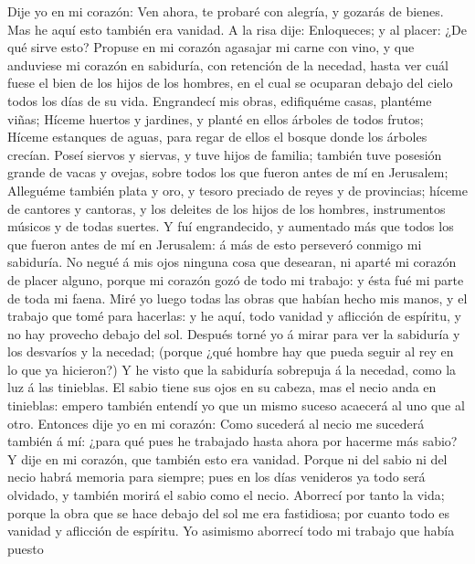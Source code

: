  Dije yo en mi corazón: Ven ahora, te probaré con alegría,
y gozarás de bienes. Mas he aquí esto también era vanidad.
 A la risa dije: Enloqueces; y al placer: ¿De qué sirve
esto?  Propuse en mi corazón agasajar mi carne con vino, y
que anduviese mi corazón en sabiduría, con retención de la necedad,
hasta ver cuál fuese el bien de los hijos de los hombres, en el cual se
ocuparan debajo del cielo todos los días de su vida. 
Engrandecí mis obras, edifiquéme casas, plantéme viñas; 
Híceme huertos y jardines, y planté en ellos árboles de todos frutos;
 Híceme estanques de aguas, para regar de ellos el bosque
donde los árboles crecían.  Poseí siervos y siervas, y
tuve hijos de familia; también tuve posesión grande de vacas y ovejas,
sobre todos los que fueron antes de mí en Jerusalem; 
Alleguéme también plata y oro, y tesoro preciado de reyes y de
provincias; híceme de cantores y cantoras, y los deleites de los hijos
de los hombres, instrumentos músicos y de todas suertes. 
Y fuí engrandecido, y aumentado más que todos los que fueron antes de mí
en Jerusalem: á más de esto perseveró conmigo mi sabiduría.
 No negué á mis ojos ninguna cosa que desearan, ni aparté
mi corazón de placer alguno, porque mi corazón gozó de todo mi trabajo:
y ésta fué mi parte de toda mi faena.  Miré yo luego
todas las obras que habían hecho mis manos, y el trabajo que tomé para
hacerlas: y he aquí, todo vanidad y aflicción de espíritu, y no hay
provecho debajo del sol.  Después torné yo á mirar para
ver la sabiduría y los desvaríos y la necedad; (porque ¿qué hombre hay
que pueda seguir al rey en lo que ya hicieron?)  Y he
visto que la sabiduría sobrepuja á la necedad, como la luz á las
tinieblas.  El sabio tiene sus ojos en su cabeza, mas el
necio anda en tinieblas: empero también entendí yo que un mismo suceso
acaecerá al uno que al otro.  Entonces dije yo en mi
corazón: Como sucederá al necio me sucederá también á mí: ¿para qué pues
he trabajado hasta ahora por hacerme más sabio? Y dije en mi corazón,
que también esto era vanidad.  Porque ni del sabio ni del
necio habrá memoria para siempre; pues en los días venideros ya todo
será olvidado, y también morirá el sabio como el necio. 
Aborrecí por tanto la vida; porque la obra que se hace debajo del sol me
era fastidiosa; por cuanto todo es vanidad y aflicción de espíritu.
 Yo asimismo aborrecí todo mi trabajo que había puesto

